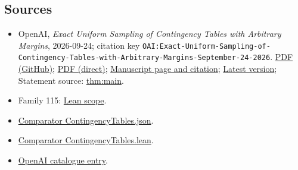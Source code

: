 \documentclass[11pt]{article}
\begin{document}
\subsection{Sources}
\begin{itemize}
\item OpenAI, \emph{Exact Uniform Sampling of Contingency Tables with Arbitrary Margins}, 2026-09-24; citation key \texttt{OAI:Exact-Uniform-Sampling-of-Contingency-Tables-with-Arbitrary-Margins-September-24-2026}. \href{https://github.com/openai/math/blob/adc7f1241b42e322a6451854ab7e4b4c146bf78a/preprints/Exact-Uniform-Sampling-of-Contingency-Tables-with-Arbitrary-Margins-September-24-2026/main.pdf}{PDF (GitHub)}; \href{https://github.com/openai/math/raw/adc7f1241b42e322a6451854ab7e4b4c146bf78a/preprints/Exact-Uniform-Sampling-of-Contingency-Tables-with-Arbitrary-Margins-September-24-2026/main.pdf}{PDF (direct)}; \href{https://github.com/openai/math/blob/adc7f1241b42e322a6451854ab7e4b4c146bf78a/preprints/Exact-Uniform-Sampling-of-Contingency-Tables-with-Arbitrary-Margins-September-24-2026/README.md}{Manuscript page and citation}; \href{https://github.com/openai/math/blob/main/preprints/Exact-Uniform-Sampling-of-Contingency-Tables-with-Arbitrary-Margins-September-24-2026/main.pdf}{Latest version}; Statement source: \href{https://github.com/openai/math/blob/adc7f1241b42e322a6451854ab7e4b4c146bf78a/preprints/Exact-Uniform-Sampling-of-Contingency-Tables-with-Arbitrary-Margins-September-24-2026/build/sections/introduction.tex\#L18}{thm:main}.
\item Family 115: \href{https://github.com/openai/math/blob/adc7f1241b42e322a6451854ab7e4b4c146bf78a/lean/docs/115.md}{Lean scope}.
\item \href{https://github.com/openai/math/blob/adc7f1241b42e322a6451854ab7e4b4c146bf78a/lean/ComparatorChallenges/ContingencyTables.json}{Comparator ContingencyTables.json}.
\item \href{https://github.com/openai/math/blob/adc7f1241b42e322a6451854ab7e4b4c146bf78a/lean/ComparatorChallenges/ContingencyTables.lean}{Comparator ContingencyTables.lean}.
\item \href{https://github.com/openai/math/blob/adc7f1241b42e322a6451854ab7e4b4c146bf78a/CONTENTS.md}{OpenAI catalogue entry}.
\end{itemize}
\end{document}
